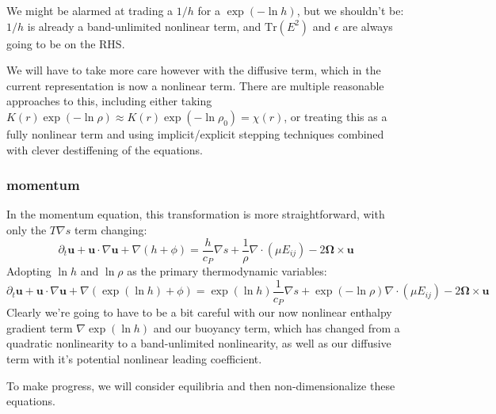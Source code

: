 \documentclass{aastex62}
\newcommand{\del}{\nabla}
\renewcommand{\vec}{\boldsymbol}
\begin{document}
We might be alarmed at trading a $1/h$ for a $\exp{(-\ln h)}$, but we shouldn't be: $1/h$ is already a band-unlimited nonlinear term, and $\mathrm{Tr}(E^2)$ and $\epsilon$ are always going to be on the RHS.

We will have to take more care however with the diffusive term, which in the current representation is now a nonlinear term.  There are multiple reasonable approaches to this, including either taking $K(r) \exp(-\ln \rho) \approx K(r) \exp(-\ln \rho_0) = \chi(r)$, or treating this as a fully nonlinear term and using implicit/explicit stepping techniques combined with clever destiffening of the equations.

\subsubsection{momentum}
In the momentum equation, this transformation is more straightforward, with only the $T\del s$ term changing:
\begin{equation}
  \partial_t \vec{u} + \vec{u}\cdot \del \vec{u} + \del (h + \phi) = \frac{h}{c_P}\del s + \frac{1}{\rho}\del\cdot (\mu E_{ij}) - 2 \vec{\Omega} \times \vec{u}
\end{equation}
Adopting $\ln h$ and $\ln \rho$ as the primary thermodynamic variables:
\begin{equation}
  \partial_t \vec{u} + \vec{u}\cdot \del \vec{u} + \del (\exp(\ln h) + \phi) = \exp(\ln h)\frac{1}{c_P}\del s + \exp(-\ln\rho)\del\cdot (\mu E_{ij}) - 2 \vec{\Omega} \times \vec{u}
\end{equation}
Clearly we're going to have to be a bit careful with our now nonlinear enthalpy gradient term $\del \exp(\ln h)$ and our buoyancy term, which has changed from a quadratic nonlinearity to a band-unlimited nonlinearity, as well as our diffusive term with it's potential nonlinear leading coefficient.

To make progress, we will consider equilibria and then non-dimensionalize these equations.
\end{document}
